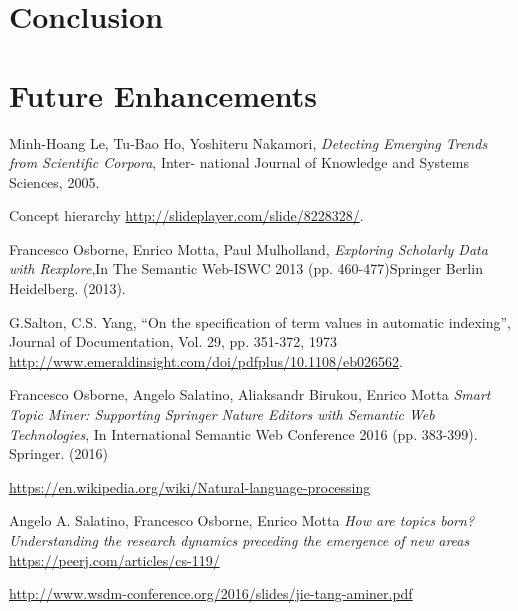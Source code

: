 \documentclass[12pt]{article}
\begin{document}
\section{Conclusion}
\section{Future Enhancements}















%
\begin{thebibliography}{9}

Minh-Hoang Le, Tu-Bao Ho, Yoshiteru Nakamori,
\textit{Detecting Emerging Trends from Scientific Corpora}, Inter- national Journal of Knowledge and Systems Sciences, 2005.

Concept hierarchy
\url{http://slideplayer.com/slide/8228328/}.

Francesco Osborne, Enrico Motta, Paul Mulholland,
\textit{Exploring Scholarly Data with Rexplore},In The Semantic Web-ISWC 2013 (pp. 460-477)Springer Berlin Heidelberg. (2013).
 
 G.Salton, C.S. Yang, “On the specification of term
values in automatic indexing”, Journal of
Documentation, Vol. 29, pp. 351-372, 1973 
 \url{http://www.emeraldinsight.com/doi/pdfplus/10.1108/eb026562}.
 
Francesco Osborne, Angelo Salatino, Aliaksandr Birukou, Enrico Motta
\textit{Smart Topic Miner: Supporting Springer Nature Editors with Semantic Web Technologies}, In International Semantic Web Conference 2016 (pp. 383-399). Springer. (2016)



 \url{https://en.wikipedia.org/wiki/Natural-language-processing}

Angelo A. Salatino​, Francesco Osborne, Enrico Motta
\textit{How are topics born? Understanding the research dynamics preceding the emergence of new areas}
 \url{https://peerj.com/articles/cs-119/}
 
 \url{http://www.wsdm-conference.org/2016/slides/jie-tang-aminer.pdf}
\end{thebibliography}
\end{document}
